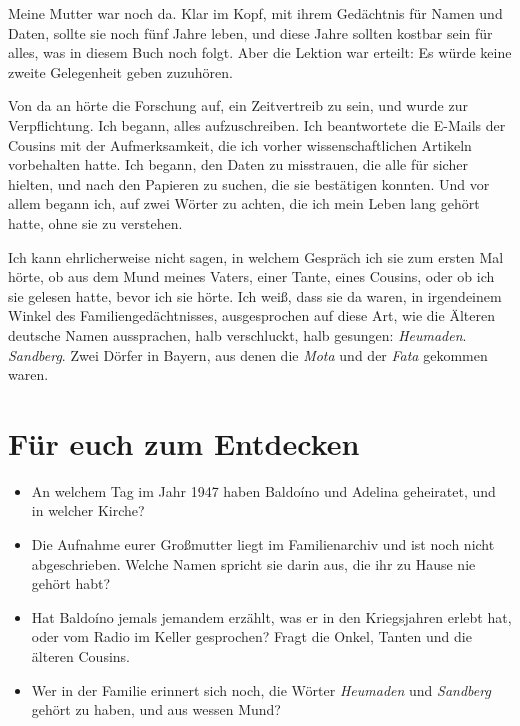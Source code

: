 \documentclass[
  ngerman,
  11pt,
  openany]{book}
\providecommand{\tightlist}{%
  \setlength{\itemsep}{0pt}\setlength{\parskip}{0pt}}
\begin{document}
Meine Mutter war noch da. Klar im Kopf, mit ihrem Gedächtnis für Namen
und Daten, sollte sie noch fünf Jahre leben, und diese Jahre sollten
kostbar sein für alles, was in diesem Buch noch folgt. Aber die Lektion
war erteilt: Es würde keine zweite Gelegenheit geben zuzuhören.

Von da an hörte die Forschung auf, ein Zeitvertreib zu sein, und wurde
zur Verpflichtung. Ich begann, alles aufzuschreiben. Ich beantwortete
die E-Mails der Cousins mit der Aufmerksamkeit, die ich vorher
wissenschaftlichen Artikeln vorbehalten hatte. Ich begann, den Daten zu
misstrauen, die alle für sicher hielten, und nach den Papieren zu
suchen, die sie bestätigen konnten. Und vor allem begann ich, auf zwei
Wörter zu achten, die ich mein Leben lang gehört hatte, ohne sie zu
verstehen.

Ich kann ehrlicherweise nicht sagen, in welchem Gespräch ich sie zum
ersten Mal hörte, ob aus dem Mund meines Vaters, einer Tante, eines
Cousins, oder ob ich sie gelesen hatte, bevor ich sie hörte. Ich weiß,
dass sie da waren, in irgendeinem Winkel des Familiengedächtnisses,
ausgesprochen auf diese Art, wie die Älteren deutsche Namen aussprachen,
halb verschluckt, halb gesungen: \emph{Heumaden}. \emph{Sandberg}. Zwei
Dörfer in Bayern, aus denen die \emph{Mota} und der \emph{Fata} gekommen
waren.

\section{Für euch zum Entdecken}\label{fuxfcr-euch-zum-entdecken}

\begin{itemize}
\tightlist
\item
  An welchem Tag im Jahr 1947 haben Baldoíno und Adelina geheiratet, und
  in welcher Kirche?
\item
  Die Aufnahme eurer Großmutter liegt im Familienarchiv und ist noch
  nicht abgeschrieben. Welche Namen spricht sie darin aus, die ihr zu
  Hause nie gehört habt?
\item
  Hat Baldoíno jemals jemandem erzählt, was er in den Kriegsjahren
  erlebt hat, oder vom Radio im Keller gesprochen? Fragt die Onkel,
  Tanten und die älteren Cousins.
\item
  Wer in der Familie erinnert sich noch, die Wörter \emph{Heumaden} und
  \emph{Sandberg} gehört zu haben, und aus wessen Mund?
\end{itemize}
\end{document}
